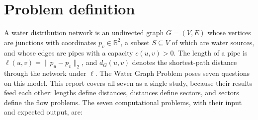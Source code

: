 \section{Problem definition}\label{sec:problem}
A water distribution network is an undirected graph $G=(V,E)$ whose vertices are junctions with coordinates $p_v\in\mathbb{R}^2$, a subset $S\subseteq V$ of which are water sources, and whose edges are pipes with a capacity $c(u,v)>0$. The length of a pipe is $\ell(u,v)=\lVert p_u-p_v\rVert_2$, and $d_G(u,v)$ denotes the shortest-path distance through the network under $\ell$. The Water Graph Problem \citep{narvaez_slides} poses seven questions on this model. This report covers all seven as a single study, because their results feed each other: lengths define distances, distances define sectors, and sectors define the flow problems. The seven computational problems, with their input and expected output, are:

